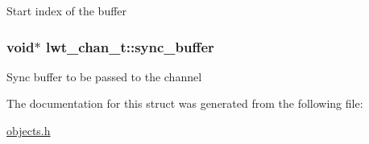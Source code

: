 Start index of the buffer \hypertarget{structlwt__channel_a19260280268d501a8e6d341c21eba961}{
\subsubsection[{sync\+\_\+buffer}]{\setlength{\rightskip}{0pt plus 5cm}void$\ast$ lwt\+\_\+chan\+\_\+t\+::sync\+\_\+buffer}}\label{structlwt__channel_a19260280268d501a8e6d341c21eba961}
Sync buffer to be passed to the channel 

The documentation for this struct was generated from the following file\+:\begin{DoxyCompactItemize}
\item 
\hyperlink{objects_8h}{objects.\+h}\end{DoxyCompactItemize}
